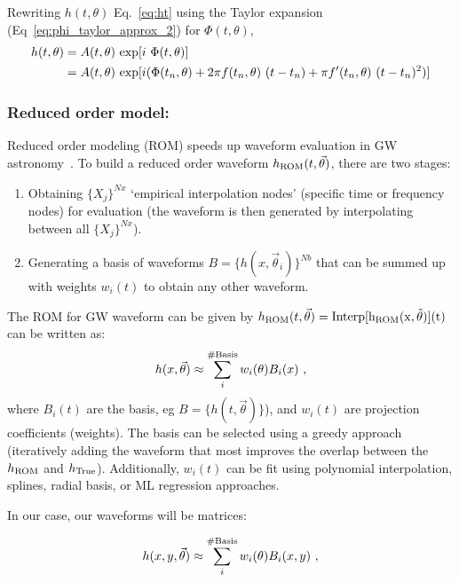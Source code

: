 \documentclass{article}
\begin{document}
Rewriting $h(t,\theta)$ Eq.~\ref{eq:ht} using the Taylor expansion (Eq~\ref{eq:phi_taylor_approx_2}) for $\Phi(t,\theta)$,
\begin{align}
    h(t,\theta) &= A(t,\theta)\ {\rm exp}[i\ \Phi(t, \theta)]\\
                &= A(t,\theta)\ {\rm exp}[i ( \Phi(t_n, \theta) + 2\pi f(t_n, \theta)\ (t - t_n) + \pi f'(t_n, \theta)\ (t - t_n)^2)]
\end{align}
     





\subsubsection{Reduced order model:}
Reduced order modeling (ROM) speeds up waveform evaluation in GW astronomy~\cite{2022LRR....25....2T}. To build a reduced order waveform $h_{\rm ROM}(t, \vec{\theta})$, there are two stages:
\begin{enumerate}
    \item Obtaining $\{X_j\}^{Nx}$ `empirical interpolation nodes' (specific time or frequency nodes) for evaluation (the waveform is then generated by interpolating between all $\{X_j\}^{Nx}$).
    \item Generating a basis of waveforms $B=\{h(x,\vec{\theta}_i)\}^{Nb}$ that can be summed up with weights $w_i(t)$ to obtain any other waveform.
\end{enumerate}

The ROM for GW waveform can be given by $h_{\rm ROM}(t,\vec{\theta})=\rm{Interp}[h_{\rm ROM}(x,\vec{\theta})](t)$ can be written as:
\begin{equation}
    h(x,\vec{\theta}) \approx \sum^{\rm \#Basis}_i w_i(\theta) B_i(x)\ ,
\end{equation}
where $B_i(t)$ are the basis, eg $B = \{h(t, \vec{\theta})\}$), and $w_i(t)$ are projection coefficients (weights). The basis can be selected using a greedy approach (iteratively adding the waveform that most improves the overlap between the $h_{\rm ROM}$ and $h_{\rm True}$). Additionally, $w_i(t)$ can be fit using  polynomial interpolation, splines, radial basis, or ML
regression approaches.


In our case, our waveforms will be matrices:

\begin{equation}
    h(x,y,\vec{\theta}) \approx \sum^{\rm \#Basis}_i w_i(\theta) B_i(x,y)\ ,
\end{equation}
\end{document}
